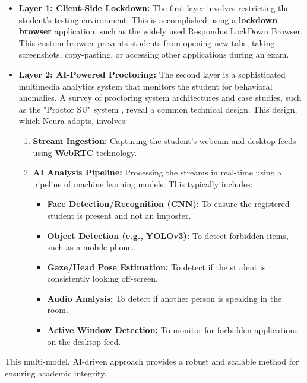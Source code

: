 \begin{itemize}
    \item \textbf{Layer 1: Client-Side Lockdown:} The first layer involves restricting the student's testing environment. This is accomplished using a \textbf{lockdown browser} application, such as the widely used Respondus LockDown Browser.\cite{respondus} This custom browser prevents students from opening new tabs, taking screenshots, copy-pasting, or accessing other applications during an exam.\cite{respondus_video}

    \item \textbf{Layer 2: AI-Powered Proctoring:} The second layer is a sophisticated multimedia analytics system that monitors the student for behavioral anomalies.\cite{proctor_anomalies} A survey of proctoring system architectures \cite{proctor_survey_arch} and case studies, such as the "Proctor SU" system \cite{proctor_su}, reveal a common technical design. This design, which Neura adopts, involves:
    \begin{enumerate}
        \item \textbf{Stream Ingestion:} Capturing the student's webcam and desktop feeds using \textbf{WebRTC} technology.\cite{webrtc1, webrtc2}
        \item \textbf{AI Analysis Pipeline:} Processing the streams in real-time using a pipeline of machine learning models.\cite{webrtc2, proctor_pipeline1} This typically includes:
        \begin{itemize}
            \item \textbf{Face Detection/Recognition (CNN):} To ensure the registered student is present and not an imposter.\cite{proctor_pipeline1, proctor_pipeline2}
            \item \textbf{Object Detection (e.g., YOLOv3):} To detect forbidden items, such as a mobile phone.\cite{proctor_su}
            \item \textbf{Gaze/Head Pose Estimation:} To detect if the student is consistently looking off-screen.
            \item \textbf{Audio Analysis:} To detect if another person is speaking in the room.
            \item \textbf{Active Window Detection:} To monitor for forbidden applications on the desktop feed.\cite{proctor_su}
        \end{itemize}
    \end{enumerate}
\end{itemize}

This multi-model, AI-driven approach provides a robust and scalable method for ensuring academic integrity.\cite{proctor_su}

